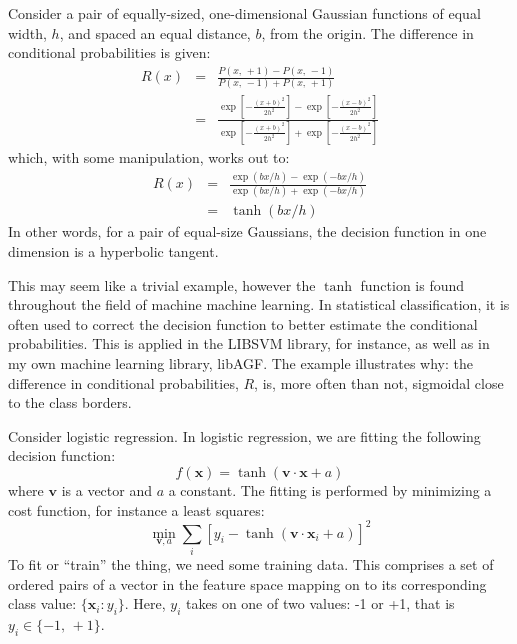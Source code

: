\documentclass{article}
\renewcommand{\vec}[1]{\boldsymbol{#1}}
\begin{document}
Consider a pair of equally-sized, one-dimensional Gaussian functions of 
equal width, $h$, and spaced an equal distance, $b$, from the origin.
The difference in conditional probabilities is given:
\begin{eqnarray}
	R(x) & = & \frac{P(x,\,+1) - P(x,\,-1)}{P(x,\,-1)+P(x,\,+1)} \label{oned1}\\
	     & = & \frac{\exp \left [ -\frac{(x+b)^2}{2 h^2} \right ] - \exp \left [ -\frac{(x-b)^2}{2 h^2} \right ] }{\exp \left [ -\frac{(x+b)^2}{2 h^2} \right ] + \exp \left [ -\frac{(x-b)^2}{2 h^2} \right ]}
\end{eqnarray}
which, with some manipulation, works out to:
\begin{eqnarray}
	R(x) & = & \frac{\exp (b x/h) - \exp (- b x/h)}
	{\exp(b x/h) + \exp(-b x/h)}\\
		& = & \tanh (b x/h)
	\label{logistic_1d}
\end{eqnarray}
In other words, for a pair of equal-size Gaussians, the decision function
in one dimension is a hyperbolic tangent.

This may seem like a trivial example, however the $\tanh$ function is found
throughout the field of machine machine learning.
In statistical classification, it is often used to correct the decision
function to better estimate the conditional probabilities.
This is applied in the LIBSVM library, for instance, as well as in my own
machine learning library, libAGF.
The example illustrates why: the difference in conditional probabilities, $R$,
is, more often than not, sigmoidal close to the class borders.

Consider logistic regression. In logistic regression, we are fitting the
following decision function:
\begin{equation}
	f(\vec x) = \tanh (\vec v \cdot \vec x + a)
	\label{logistic}
\end{equation}
where $\vec v$ is a vector and $a$ a constant.
The fitting is performed by minimizing a cost function, for instance a least squares:
\begin{equation}
	\min_{\vec v, a} \sum_i \left [y_i - \tanh(\vec v \cdot \vec x_i + a)\right ]^2
	\label{logistic_fit}
\end{equation}
To fit or ``train'' the thing, we need some training data.
This comprises a set of ordered
pairs of a vector in the feature space mapping on to its corresponding 
class value: $\lbrace \vec x_i:y_i \rbrace$.
Here, $y_i$ takes on one of two values: -1 or +1, that is
$y_i \in \lbrace -1,\, +1 \rbrace$.
\end{document}
